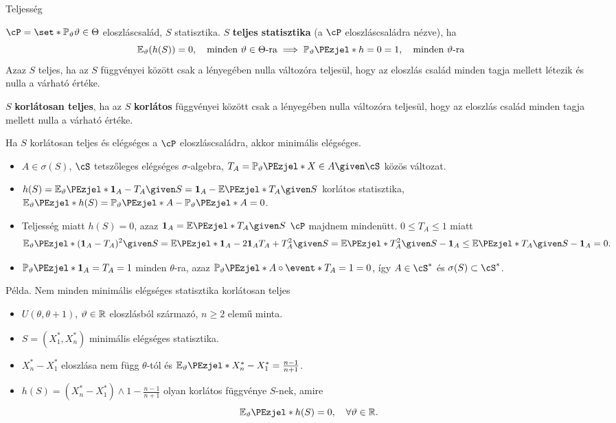 \documentclass[aspectratio=169,notheorems,9pt,\option]{beamer}
\begin{document}
\begin{frame}{Teljesség}
  \begin{df}
    $\cP=\set*{\P[\theta]}{\theta\in\Theta}$ eloszláscsalád, 
    $S$ statisztika. $S$ \textbf{teljes statisztika} (a $\cP$ eloszláscsaládra nézve), ha 
    \begin{displaymath}
      \E[\theta](h(S))=0,\quad\text{minden $\theta\in\Theta$-ra}\implies \P[\theta]{h=0}=1,\quad\text{minden $\theta$-ra}
    \end{displaymath} 
    Azaz $S$ teljes, ha az $S$ függvényei között csak a lényegében nulla változóra teljesül, hogy  
    az eloszlás család minden tagja mellett létezik és nulla a várható értéke.

    $S$ \textbf{korlátosan teljes}, ha az $S$ \textbf{korlátos} függvényei között csak a 
    lényegében nulla változóra teljesül, hogy  
    az eloszlás család minden tagja mellett  nulla a várható értéke.
  \end{df}
  \begin{theorem}
    Ha $S$ korlátosan teljes és elégséges a $\cP$ eloszláscsaládra, akkor minimális elégséges. 
  \end{theorem}
  \begin{itemize}
    \item $A\in\sigma(S)$, $\cS$ tetszőleges elégséges $\sigma$-algebra, $T_A=\P[\theta]{X\in A\given \cS}$ közös változat.
    \item $h(S)=\E[\theta]{\I[A]-T_A\given S}=\I[A]-\E{T_A\given S}$ korlátos statisztika, 
    $\E[\theta]{h(S)}=\P[\theta]{A}-\P[\theta]{A}=0$.
    \item Teljesség miatt $h(S)=0$, azaz $\I[A]=\E{T_A\given S}$ $\cP$ majdnem mindenütt. $0\leq T_A\leq 1$ miatt
    \begin{displaymath}
      \E[\theta]{(\I[A]-T_A)^2\given S}=\E{\I[A]-2\I[A]T_A+T_A^2\given S}
      = \E{T_A^2\given S}-\I[A]\leq\E{T_A\given S}-\I[A]=0.
    \end{displaymath}
    \item $\P[\theta]{\I[A]=T_A}=1$ minden $\theta$-ra, 
    azaz $\P[\theta]{A\circ \event*{T_A=1}}=0$, így $A\in\cS^*$ és $\sigma(S)\subset\cS^*$.
  \end{itemize}  
\end{frame}


\begin{frame}{Példa. Nem minden minimális elégséges statisztika korlátosan teljes}
  \begin{itemize}
    \item $U(\theta,\theta+1)$, $\vartheta\in\mathbb{R}$ eloszlásból származó, $n\geq2$ elemű minta.
    \item $S=(X_1^*,X_n^*)$ minimális elégséges statisztika.
    \item $X_n^*-X_1^*$ eloszlása nem függ $\theta$-tól és $\E[\theta]{X_n^*-X_1^*}=\frac{n-1}{n+1}$.
    \item $h(S)=(X_n^*-X_1^*)\wedge1-\frac{n-1}{n+1}$ olyan korlátos függvénye $S$-nek, amire
    \begin{displaymath}
      \E[\theta]{h(S)}=0,\quad\forall \theta\in\real.
    \end{displaymath}
  \end{itemize}
\end{frame}
\end{document}
